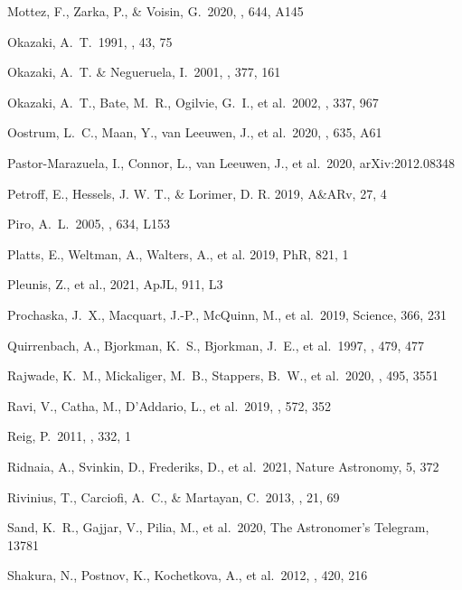 \documentclass[twocolumn]{aastex62}
\begin{document}
\begin{thebibliography}
 Mottez, F., Zarka, P., \& Voisin, G.\ 2020, \aap, 644, A145

 Okazaki, A.~T.\ 1991, \pasj, 43, 75

 Okazaki, A.~T. \& Negueruela, I.\ 2001, \aap, 377, 161

 Okazaki, A.~T., Bate, M.~R., Ogilvie, G.~I., et al.\ 2002, \mnras, 337, 967

 Oostrum, L.~C., Maan, Y., van Leeuwen, J., et al.\ 2020, \aap, 635, A61

 Pastor-Marazuela, I., Connor, L., van Leeuwen, J., et al.\ 2020, arXiv:2012.08348

 Petroff, E., Hessels, J. W. T., \& Lorimer, D. R. 2019, A\&ARv, 27, 4

 Piro, A.~L.\ 2005, \apjl, 634, L153

 Platts, E., Weltman, A., Walters, A., et al. 2019, PhR, 821, 1

 Pleunis, Z., et al., 2021, ApJL, 911, L3

 Prochaska, J.~X., Macquart, J.-P., McQuinn, M., et al.\ 2019, Science, 366, 231

 Quirrenbach, A., Bjorkman, K.~S., Bjorkman, J.~E., et al.\ 1997, \apj, 479, 477

 Rajwade, K.~M., Mickaliger, M.~B., Stappers, B.~W., et al.\ 2020, \mnras, 495, 3551

 Ravi, V., Catha, M., D'Addario, L., et al.\ 2019, \nat, 572, 352

 Reig, P.\ 2011, \apss, 332, 1

 Ridnaia, A., Svinkin, D., Frederiks, D., et al.\ 2021, Nature Astronomy, 5, 372

 Rivinius, T., Carciofi, A.~C., \& Martayan, C.\ 2013, \aapr, 21, 69

 Sand, K.~R., Gajjar, V., Pilia, M., et al.\ 2020, The Astronomer's Telegram, 13781

 Shakura, N., Postnov, K., Kochetkova, A., et al.\ 2012, \mnras, 420, 216


\end{thebibliography}
\end{document}
